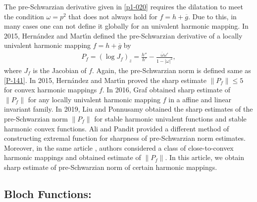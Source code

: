 \documentclass[a4paper,12pt]{amsart}
\theoremstyle{definition}
\begin{document}
	The pre-Schwarzian derivative given in  \eqref{p1-020}  requires the dilatation to meet the condition $\omega = p^2$ that does not always hold for  $f=h+\overline{g}$. Due to this, in many cases one can not define it globally  for an univalent harmonic mapping. In 2015, Hern{\'a}ndez and Mart{\'\i}n \cite{Hernandez-Martin-2015} defined the pre-Schwarzian derivative of a locally univalent harmonic mapping $f=h+\overline{g}$ by\\
	\begin{align}\label{p1-027}
		P_f = \left(\log J_f\right)_z = \frac{h''}{h'}-\frac{\overline{\omega}\omega'}{1-|\omega|^2},
	\end{align}
	where $J_f$ is the Jacobian of $f$. Again, the pre-Schwarzian norm is defined same as \eqref{P-141}. In 2015, Hern{\'a}ndez and Mart{\'\i}n \cite{Hernandez-Martin-2015} proved the sharp estimate $\|P_f\|\le 5$ for convex harmonic mappings $f$. In 2016, Graf \cite{GRAF-2016} obtained sharp estimate of $\|P_f\|$ for any locally univalent harmonic mapping $f$ in a affine and linear invariant family. In 2019, Liu and Ponnusamy \cite{Liu-Ponnusamy-2018} obtained the sharp estimates of the pre-Schwarzian norm $\|P_f\|$ for stable harmonic univalent functions and stable harmonic convex functions. Ali and Pandit \cite{Ali-Pandit-2023} provided a different method of constructing extremal function for sharpness of pre-Schwarzian norm estimates. Moreover, in the same article \cite{Ali-Pandit-2023}, authors considered a class of close-to-convex harmonic mappings and obtained estimate of $\|P_f\|.$ In this article, we obtain sharp estimate of pre-Schwarzian norm of certain harmonic mappings.\\
	
	
	
	
	
		\subsection{Bloch Functions:}
	
\end{document}
